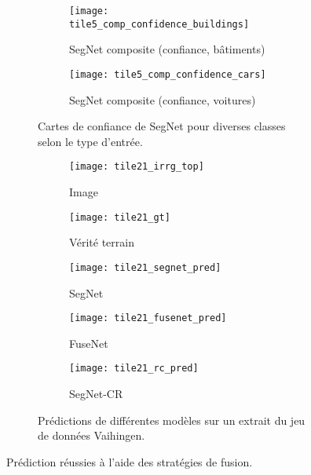 \begin{figure}[!tb]
\begin{subfigure}{\textwidth}
\begin{subfigure}{0.19\textwidth}
        \end{subfigure}
        \begin{subfigure}{0.19\textwidth}
        	\texttt{[image: tile5\_comp\_confidence\_buildings]}
        	\caption*{SegNet composite (confiance, bâtiments)}
        \end{subfigure}
        \begin{subfigure}{0.19\textwidth}
        	\texttt{[image: tile5\_comp\_confidence\_cars]}
        	\caption*{SegNet composite (confiance, voitures)}
        \end{subfigure}
        \caption{Cartes de confiance de SegNet pour diverses classes selon le type d'entrée.}
        \label{fig:confidence_vaihingen_fusion}
    \end{subfigure}
    \begin{subfigure}{\textwidth}
    	\captionsetup[subfigure]{singlelinecheck=off,justification=centering}
  		\captionsetup[subfigure]{labelformat=empty}
    	\begin{subfigure}{0.19\textwidth}
        	\texttt{[image: tile21\_irrg\_top]}
      		\caption*{Image }
        \end{subfigure}
        \begin{subfigure}{0.19\textwidth}
        	\texttt{[image: tile21\_gt]}
        	\caption*{Vérité terrain}
        \end{subfigure}
        \begin{subfigure}{0.19\textwidth}
        	\texttt{[image: tile21\_segnet\_pred]}
        	\caption*{SegNet}
        \end{subfigure}
        \begin{subfigure}{0.19\textwidth}
        	\texttt{[image: tile21\_fusenet\_pred]}
        	\caption*{FuseNet}
        \end{subfigure}
        \begin{subfigure}{0.19\textwidth}
        	\texttt{[image: tile21\_rc\_pred]}
        	\caption*{SegNet-CR}
        \end{subfigure}
        \caption{Prédictions de différentes modèles sur un extrait du jeu de données  Vaihingen.}
        \label{fig:fusion_exemple2}
    \end{subfigure}

	\caption[Prédiction réussies à l'aide des stratégies de fusion.]{Prédiction réussies à l'aide des stratégies de fusion.\\
  \isprslegende}
   	\label{fig:fusion_success}
\end{figure}

